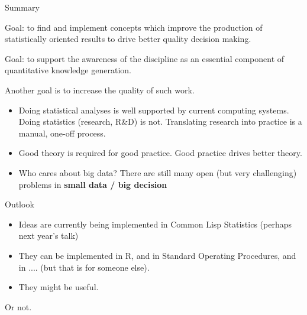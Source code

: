 \documentclass{beamer}
\begin{document}
\begin{frame}{Summary}

  Goal: to find and implement concepts which improve the production of
  statistically oriented results to drive better quality decision
  making. 

  Goal: to support the awareness of the discipline as an essential
  component of quantitative knowledge generation. 

  Another goal is to increase the quality of such work.
  \begin{itemize}
  \item Doing statistical analyses is well supported by current
    computing systems.  Doing statistics (research, R\&D) is not.
    Translating research into practice is a manual, one-off process.
  \item Good theory is required for good practice.  Good practice
    drives better theory.
  \item Who cares about big data?  There are still many open (but very
    challenging) problems in \textbf{small data / big decision}
  \end{itemize}
\end{frame}

\begin{frame}{Outlook}
  
  \begin{itemize}
  \item Ideas are currently being implemented in Common Lisp
    Statistics (perhaps next year's talk) 
  \item They can be implemented in R, and in Standard Operating
    Procedures, and in .... (but that is for someone else).
  \item They might be useful.
  \end{itemize}
  Or not.  
\end{frame}



\end{document}
